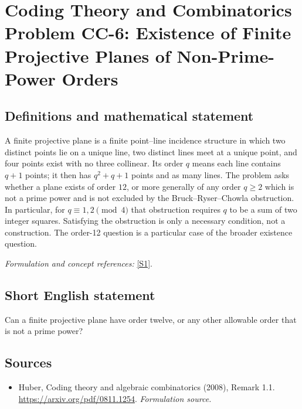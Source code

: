 \documentclass[11pt]{article}
\begin{document}
\section*{\texorpdfstring{Coding Theory and Combinatorics Problem CC-6: Existence of Finite Projective Planes of Non-Prime-Power Orders}{Coding Theory and Combinatorics Problem CC-6: Existence of Finite Projective Planes of Non-Prime-Power Orders}}\label{30006910}
\subsection{Definitions and mathematical statement}
A finite projective plane is a finite point--line incidence structure in which two distinct points lie on a unique line, two distinct lines meet at a unique point, and four points exist with no three collinear. Its order $q$ means each line contains $q+1$ points; it then has $q^2+q+1$ points and as many lines. The problem asks whether a plane exists of order $12$, or more generally of any order $q\ge2$ which is not a prime power and is not excluded by the Bruck--Ryser--Chowla obstruction. In particular, for $q\equiv1,2\pmod4$ that obstruction requires $q$ to be a sum of two integer squares. Satisfying the obstruction is only a necessary condition, not a construction. The order-12 question is a particular case of the broader existence question.
\par\smallskip\textit{Formulation and concept references:} \href{https://arxiv.org/pdf/0811.1254}{[S1]}.

\subsection{Short English statement}
Can a finite projective plane have order twelve, or any other allowable order that is not a prime power?
\subsection{Sources}
\begin{itemize}
\item[S1]Huber, Coding theory and algebraic combinatorics (2008), Remark 1.1.
\url{https://arxiv.org/pdf/0811.1254}.
\textit{Formulation source.}
\end{itemize}
\end{document}
